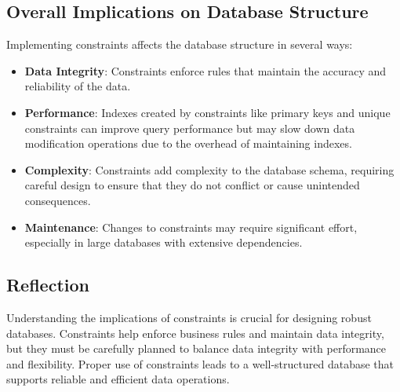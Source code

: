 \documentclass[12pt]{article}
\begin{document}
\subsection*{Overall Implications on Database Structure}

Implementing constraints affects the database structure in several ways:

\begin{itemize}
    \item \textbf{Data Integrity}: Constraints enforce rules that maintain the accuracy and reliability of the data.
    \item \textbf{Performance}: Indexes created by constraints like primary keys and unique constraints can improve query performance but may slow down data modification operations due to the overhead of maintaining indexes.
    \item \textbf{Complexity}: Constraints add complexity to the database schema, requiring careful design to ensure that they do not conflict or cause unintended consequences.
    \item \textbf{Maintenance}: Changes to constraints may require significant effort, especially in large databases with extensive dependencies.
\end{itemize}

\subsection*{Reflection}

Understanding the implications of constraints is crucial for designing robust databases. Constraints help enforce business rules and maintain data integrity, but they must be carefully planned to balance data integrity with performance and flexibility. Proper use of constraints leads to a well-structured database that supports reliable and efficient data operations.
\end{document}
